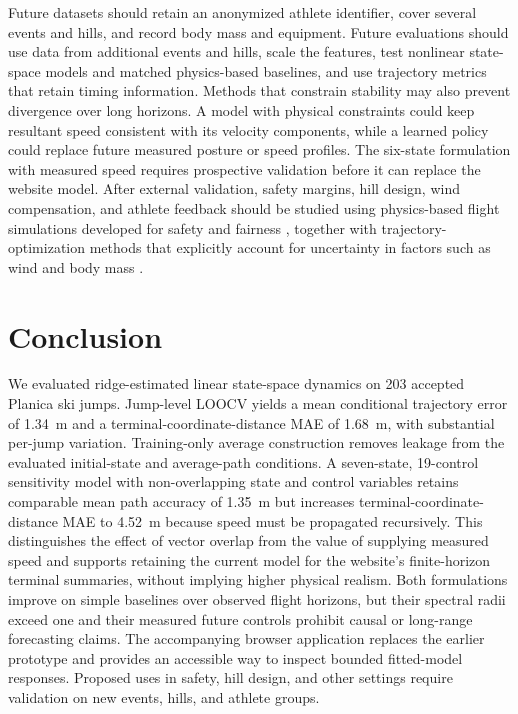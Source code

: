 \documentclass[11pt,twoside,a4paper]{article}
\begin{document}
Future datasets should retain an anonymized athlete identifier, cover several events and hills, and record body mass and equipment. Future evaluations should use data from additional events and hills, scale the features, test nonlinear state-space models and matched physics-based baselines, and use trajectory metrics that retain timing information. Methods that constrain stability may also prevent divergence over long horizons. A model with physical constraints could keep resultant speed consistent with its velocity components, while a learned policy could replace future measured posture or speed profiles. The six-state formulation with measured speed requires prospective validation before it can replace the website model. After external validation, safety margins, hill design, wind compensation, and athlete feedback should be studied using physics-based flight simulations developed for safety and fairness \cite{muller1996dynamics}, together with trajectory-optimization methods that explicitly account for uncertainty in factors such as wind and body mass \cite{piprek2018robust}.

\section{Conclusion}\label{sec:conclusion}

We evaluated ridge-estimated linear state-space dynamics on 203 accepted Planica ski jumps. Jump-level LOOCV yields a mean conditional trajectory error of 1.34~m and a terminal-coordinate-distance MAE of 1.68~m, with substantial per-jump variation. Training-only average construction removes leakage from the evaluated initial-state and average-path conditions. A seven-state, 19-control sensitivity model with non-overlapping state and control variables retains comparable mean path accuracy of 1.35~m but increases terminal-coordinate-distance MAE to 4.52~m because speed must be propagated recursively. This distinguishes the effect of vector overlap from the value of supplying measured speed and supports retaining the current model for the website's finite-horizon terminal summaries, without implying higher physical realism. Both formulations improve on simple baselines over observed flight horizons, but their spectral radii exceed one and their measured future controls prohibit causal or long-range forecasting claims. The accompanying browser application replaces the earlier prototype and provides an accessible way to inspect bounded fitted-model responses. Proposed uses in safety, hill design, and other settings require validation on new events, hills, and athlete groups.
\end{document}
